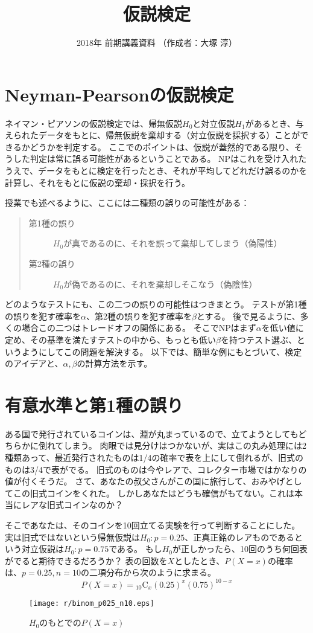 \documentclass{jsarticle}
\title{仮説検定}
\author{2018年 前期講義資料 （作成者：大塚 淳）}
\date{ }                                           %
\begin{document}
\maketitle

\section{Neyman-Pearsonの仮説検定}
ネイマン・ピアソンの仮説検定では、帰無仮説$H_0$と対立仮説$H_1$があるとき、与えられたデータをもとに、帰無仮説を棄却する（対立仮説を採択する）ことができるかどうかを判定する。
ここでのポイントは、仮説が蓋然的である限り、そうした判定は常に誤る可能性があるということである。
NPはこれを受け入れたうえで、データをもとに検定を行ったとき、それが平均してどれだけ誤るのかを計算し、それをもとに仮説の棄却・採択を行う。

授業でも述べるように、ここには二種類の誤りの可能性がある：
\begin{quote}
 \begin{description}
 \item[第1種の誤り] $H_0$が真であるのに、それを誤って棄却してしまう（偽陽性）
 \item[第2種の誤り] $H_0$が偽であるのに、それを棄却しそこなう（偽陰性）
 \end{description}
\end{quote}
どのようなテストにも、この二つの誤りの可能性はつきまとう。
テストが第1種の誤りを犯す確率を$\alpha$、第2種の誤りを犯す確率を$\beta$とする。
後で見るように、多くの場合この二つはトレードオフの関係にある。
そこでNPはまず$\alpha$を低い値に定め、その基準を満たすテストの中から、もっとも低い$\beta$を持つテスト選ぶ、というようにしてこの問題を解決する。
以下では、簡単な例にもとづいて、検定のアイデアと、$\alpha, \beta$の計算方法を示す。

\section{有意水準と第1種の誤り}
ある国で発行されているコインは、淵が丸まっているので、立てようとしてもどちらかに倒れてしまう。
肉眼では見分けはつかないが、実はこの丸み処理には2種類あって、最近発行されたものは1/4の確率で表を上にして倒れるが、旧式のものは3/4で表がでる。
旧式のものは今やレアで、コレクター市場ではかなりの値が付くそうだ。
さて、あなたの叔父さんがこの国に旅行して、おみやげとしてこの旧式コインをくれた。
しかしあなたはどうも確信がもてない。これは本当にレアな旧式コインなのか？

そこであなたは、そのコインを10回立てる実験を行って判断することにした。
実は旧式ではないという帰無仮説は$H_0: p=0.25$、正真正銘のレアものであるという対立仮説は$H_0: p=0.75$である。
もし$H_0$が正しかったら、10回のうち何回表がでると期待できるだろうか？
表の回数を$X$としたとき、$P(X=x)$の確率は、$p=0.25, n=10$の二項分布から次のように求まる。
\[
  P(X=x) = {}_{10} \mathrm{C}_{x}  (0.25)^{x} (0.75)^{10-x}
\]
\begin{figure}[ht]
 \centering
 \texttt{[image: r/binom\_p025\_n10.eps]}
 \caption{$H_0$のもとでの$P(X=x)$}
\end{figure}
\end{document}
